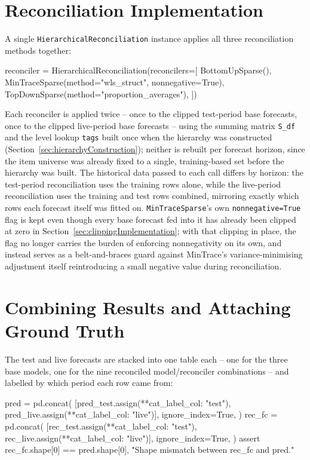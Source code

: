 \section{Reconciliation Implementation}
\label{sec:reconciliationImplementation}

A single \texttt{HierarchicalReconciliation} instance applies all three reconciliation methods together:

\begin{Python}
	reconciler = HierarchicalReconciliation(reconcilers=[
	BottomUpSparse(),
	MinTraceSparse(method="wls_struct", nonnegative=True),
	TopDownSparse(method="proportion_averages"),
	])
\end{Python}

Each reconciler is applied twice -- once to the clipped test-period base forecasts, once to the clipped live-period base forecasts -- using the summing matrix \texttt{S\_df} and the level lookup \texttt{tags} built once when the hierarchy was constructed (Section~\ref{sec:hierarchyConstruction}); neither is rebuilt per forecast horizon, since the item universe was already fixed to a single, training-based set before the hierarchy was built. The historical data passed to each call differs by horizon: the test-period reconciliation uses the training rows alone, while the live-period reconciliation uses the training and test rows combined, mirroring exactly which rows each forecast itself was fitted on. \texttt{MinTraceSparse}'s own \texttt{nonnegative=True} flag is kept even though every base forecast fed into it has already been clipped at zero in Section~\ref{sec:clippingImplementation}; with that clipping in place, the flag no longer carries the burden of enforcing nonnegativity on its own, and instead serves as a belt-and-braces guard against MinTrace's variance-minimising adjustment itself reintroducing a small negative value during reconciliation.

\section{Combining Results and Attaching Ground Truth}
\label{sec:combiningResults}

The test and live forecasts are stacked into one table each -- one for the three base models, one for the nine reconciled model/reconciler combinations -- and labelled by which period each row came from:

\begin{Python}
	pred = pd.concat(
	[pred_test.assign(**{cat_label_col: "test"}),
	pred_live.assign(**{cat_label_col: "live"})],
	ignore_index=True,
	)
	rec_fc = pd.concat(
	[rec_test.assign(**{cat_label_col: "test"}),
	rec_live.assign(**{cat_label_col: "live"})],
	ignore_index=True,
	)
	assert rec_fc.shape[0] == pred.shape[0], "Shape mismatch between rec_fc and pred."
\end{Python}

